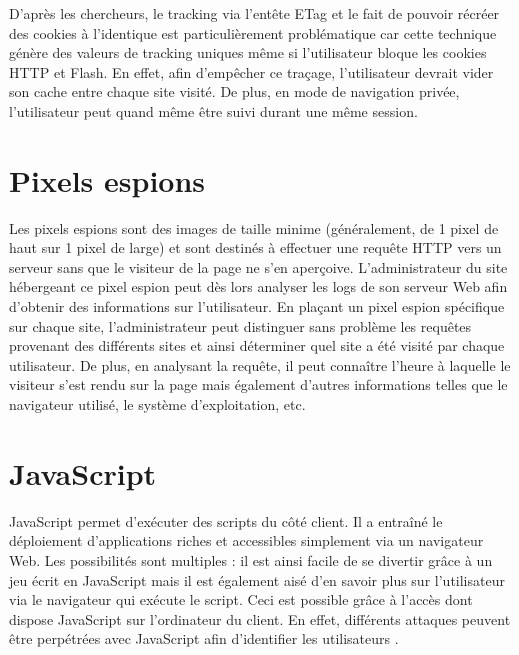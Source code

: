 D'après les chercheurs, le tracking via l'entête ETag et le fait de pouvoir récréer des cookies à l'identique est particulièrement problématique car cette technique génère des valeurs de tracking uniques même si l'utilisateur bloque les cookies HTTP et Flash. En effet, afin d'empêcher ce traçage, l'utilisateur devrait vider son cache entre chaque site visité. De plus, en mode de navigation privée, l'utilisateur peut quand même être suivi durant une même session.

\section{Pixels espions}
Les pixels espions sont des images de taille minime (généralement, de 1 pixel de haut sur 1 pixel de large) et sont destinés à effectuer une requête HTTP vers un serveur sans que le visiteur de la page ne s'en aperçoive. L'administrateur du site hébergeant ce pixel espion peut dès lors analyser les logs de son serveur Web afin d'obtenir des informations sur l'utilisateur. En plaçant un pixel espion spécifique sur chaque site, l'administrateur peut distinguer sans problème les requêtes provenant des différents sites et ainsi déterminer quel site a été visité par chaque utilisateur. De plus, en analysant la requête, il peut connaître l'heure à laquelle le visiteur s'est rendu sur la page mais également d'autres informations telles que le navigateur utilisé, le système d'exploitation, etc.

\section{JavaScript}
JavaScript permet d'exécuter des scripts du côté client. Il a entraîné le déploiement d'applications riches et accessibles simplement via un navigateur Web. Les possibilités sont multiples : il est ainsi facile de se divertir grâce à un jeu écrit en JavaScript mais il est également aisé d'en savoir plus sur l'utilisateur via le navigateur qui exécute le script. Ceci est possible grâce à l'accès dont dispose JavaScript sur l'ordinateur du client. En effet, différents attaques peuvent être perpétrées avec JavaScript afin d'identifier les utilisateurs \cite{Jang:2010:ESP:1866307.1866339}.
\newline

